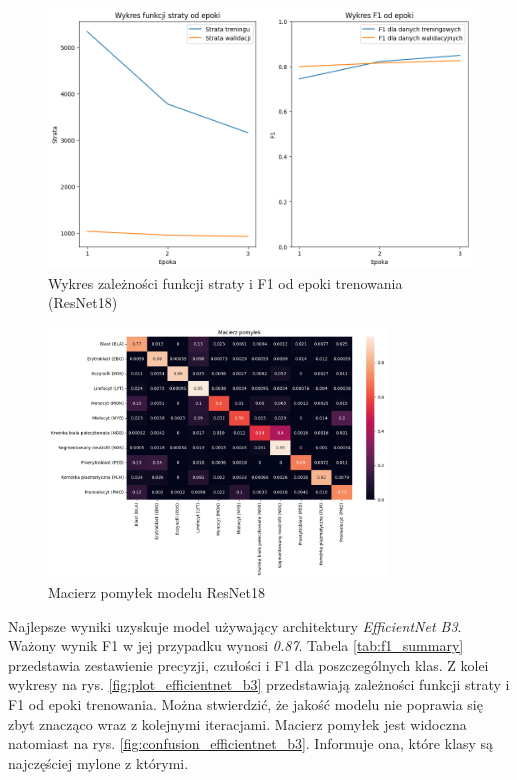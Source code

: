 \begin{figure}
    \centering
    \includegraphics[width=\textwidth]{experiments/resnet18/combined}
    \caption{Wykres zależności funkcji straty i F1 od epoki trenowania (ResNet18)}
    \label{fig:plot_resnet18}
\end{figure}
\begin{figure}
    \centering
    \includegraphics[width=0.8\textwidth]{experiments/resnet18/confusion_matrix}
    \caption{Macierz pomyłek modelu ResNet18}
    \label{fig:confusion_resnet18}
\end{figure}


Najlepsze wyniki uzyskuje model używający architektury \textit{EfficientNet B3}.
Ważony wynik F1 w jej przypadku wynosi \textit{0.87}.
Tabela \ref{tab:f1_summary} przedstawia zestawienie precyzji, czułości i F1 dla poszczególnych klas.
Z kolei wykresy na rys. \ref{fig:plot_efficientnet_b3} przedstawiają zależności funkcji straty i F1 od epoki trenowania.
Można stwierdzić, że jakość modelu nie poprawia się zbyt znacząco wraz z kolejnymi iteracjami.
Macierz pomyłek jest widoczna natomiast na rys. \ref{fig:confusion_efficientnet_b3}.
Informuje ona, które klasy są najczęściej mylone z którymi.


